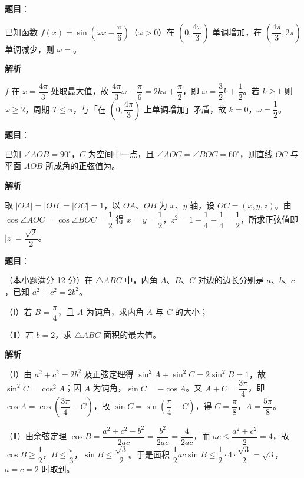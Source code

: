 \begin{answer}

\textbf{题目}：

已知函数 $f(x)=\sin\left(\omega x-\dfrac{\pi}6\right)$（$\omega>0$）在 $\left(0,\dfrac{4\pi}3\right)$ 单调增加，在 $\left(\dfrac{4\pi}3,2\pi\right)$ 单调减少，则 $\omega=$\gkblank{}。

\textbf{解析}

$f$ 在 $x=\dfrac{4\pi}3$ 处取最大值，故 $\dfrac{4\pi}3\omega-\dfrac{\pi}6=2k\pi+\dfrac{\pi}2$，即 $\omega=\dfrac32k+\dfrac12$。若 $k\geqslant1$ 则 $\omega\geqslant2$，周期 $T\leqslant\pi$，与「在 $\left(0,\dfrac{4\pi}3\right)$ 上单调增加」矛盾，故 $k=0$，$\omega=\dfrac12$。


\end{answer}
\begin{answer}

\textbf{题目}：

已知 $\angle AOB=90^\circ$，$C$ 为空间中一点，且 $\angle AOC=\angle BOC=60^\circ$，则直线 $OC$ 与平面 $AOB$ 所成角的正弦值为\gkblank{}。

\textbf{解析}

取 $|OA|=|OB|=|OC|=1$，以 $OA$、$OB$ 为 $x$、$y$ 轴，设 $OC=(x,y,z)$。由 $\cos\angle AOC=\cos\angle BOC=\dfrac12$ 得 $x=y=\dfrac12$，$z^2=1-\dfrac14-\dfrac14=\dfrac12$，所求正弦值即 $|z|=\dfrac{\sqrt2}2$。


\end{answer}
\begin{answer}

\textbf{题目}：

（本小题满分 12 分）在 $\triangle ABC$ 中，内角 $A$、$B$、$C$ 对边的边长分别是 $a$、$b$、$c$，已知 $a^2+c^2=2b^2$。

（Ⅰ）若 $B=\dfrac{\pi}4$，且 $A$ 为钝角，求内角 $A$ 与 $C$ 的大小；

（Ⅱ）若 $b=2$，求 $\triangle ABC$ 面积的最大值。

\textbf{解析}

（Ⅰ）由 $a^2+c^2=2b^2$ 及正弦定理得 $\sin^2A+\sin^2C=2\sin^2B=1$，故 $\sin^2C=\cos^2A$；因 $A$ 为钝角，$\sin C=-\cos A$。又 $A+C=\dfrac{3\pi}4$，即 $\cos A=\cos\left(\dfrac{3\pi}4-C\right)$，故 $\sin C=\sin\left(\dfrac\pi4-C\right)$，得 $C=\dfrac\pi8$，$A=\dfrac{5\pi}8$。

（Ⅱ）由余弦定理 $\cos B=\dfrac{a^2+c^2-b^2}{2ac}=\dfrac{b^2}{2ac}=\dfrac4{2ac}$，而 $ac\leqslant\dfrac{a^2+c^2}2=4$，故 $\cos B\geqslant\dfrac12$，$B\leqslant\dfrac\pi3$，$\sin B\leqslant\dfrac{\sqrt3}2$。于是面积 $\dfrac12ac\sin B\leqslant\dfrac12\cdot4\cdot\dfrac{\sqrt3}2=\sqrt3$，$a=c=2$ 时取到。


\end{answer}
